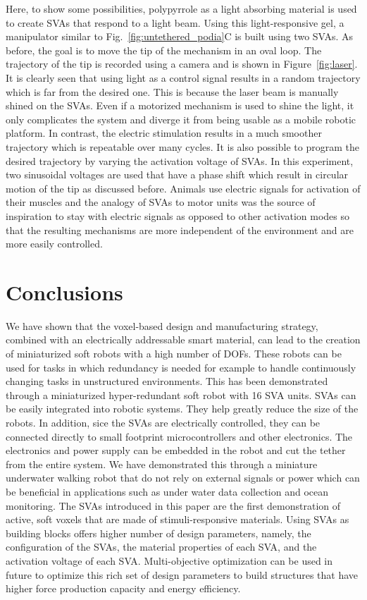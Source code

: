 Here, to show some possibilities, polypyrrole as a light absorbing material is used to create SVAs that respond to a light beam. Using this light-responsive gel, a manipulator similar to Fig.~\ref{fig:untethered_podia}C  is built using two SVAs. As before, the goal is to move the tip of the mechanism in an oval loop. The trajectory of the tip is recorded using a camera and is shown in Figure~\ref{fig:laser}. It is clearly seen that using light as a control signal results in a random trajectory which is far from the desired one. This is because the laser beam is manually shined on the SVAs. Even if a motorized mechanism is used to shine the light, it only complicates the system and diverge it from being usable as a mobile robotic platform.  In contrast, the electric stimulation results in a much smoother trajectory which is repeatable over many cycles. It is also possible to program the desired trajectory by varying the activation voltage of SVAs. In this experiment, two sinusoidal voltages are used that have a phase shift which result in circular motion of the tip as discussed before. Animals use electric signals for activation of their muscles and the analogy of SVAs to motor units was the source of inspiration to stay with electric signals as opposed to other activation modes so that the resulting mechanisms are more independent of the environment and are more easily controlled. 



\section{Conclusions}
We have shown that the voxel-based design and manufacturing strategy, combined with an electrically addressable smart material, can lead to the creation of miniaturized soft robots with a high number of DOFs. These robots can be used for tasks in which redundancy is needed for example to handle continuously changing tasks in unstructured environments. This has been demonstrated through a miniaturized hyper-redundant soft robot with 16 SVA units.
SVAs can be easily integrated into robotic systems. They help greatly reduce the size of the robots. In addition, sice the SVAs are electrically controlled, they can be connected directly to small footprint microcontrollers and other electronics. The electronics and power supply can be embedded in the robot  and cut the tether from the entire system. We have demonstrated this through a miniature underwater walking robot that do not rely on external signals or power which can be beneficial in applications such as under water data collection and ocean monitoring. The SVAs introduced in this paper are the first demonstration of active, soft voxels that are made of stimuli-responsive materials. Using SVAs as building blocks offers higher number of design parameters, namely, the configuration of the SVAs, the material properties of each SVA, and the activation voltage of each SVA. Multi-objective optimization can be used in future to optimize this rich set of design parameters to build structures that have higher force production capacity and %
energy efficiency.

